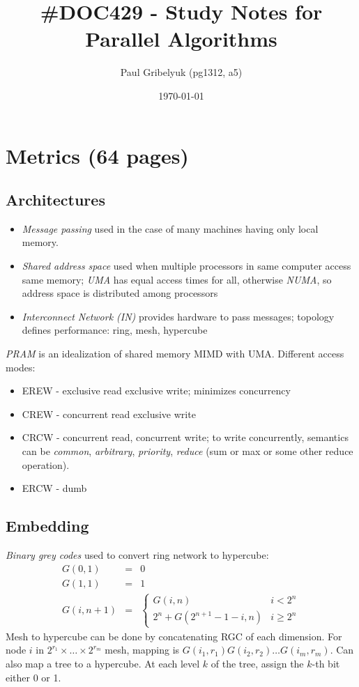 \documentclass[a4paper,10pt]{article}
\author{Paul Gribelyuk (pg1312, a5)}
\title{\Large \#DOC429 - Study Notes for Parallel Algorithms}
\date{\today}
\begin{document}
\maketitle

\section{Metrics (64 pages)}
\subsection{Architectures}
\begin{itemize}
\item \emph{Message passing} used in the case of many machines having only local memory.
\item \emph{Shared address space} used when multiple processors in same computer access same memory;  \emph{UMA} has equal access times for all, otherwise \emph{NUMA}, so address space is distributed among processors
\item \emph{Interconnect Network (IN)} provides hardware to pass messages; topology defines performance: ring, mesh, hypercube
\end{itemize}
\emph{PRAM} is an idealization of shared memory MIMD with UMA.  Different access modes:
\begin{itemize}
\item EREW - exclusive read exclusive write; minimizes concurrency
\item CREW - concurrent read exclusive write
\item CRCW - concurrent read, concurrent write; to write concurrently, semantics can be \emph{common}, \emph{arbitrary}, \emph{priority}, \emph{reduce} (sum or max or some other reduce operation).
\item ERCW - dumb
\end{itemize}
\subsection{Embedding}
\emph{Binary grey codes} used to convert ring network to hypercube:
\begin{eqnarray}
G(0,1) & = & 0 \\
G(1,1) & = & 1 \\
G(i, n+1) & = & \left\{ \begin{array}{ll}
G(i,n) & i < 2^n \\
2^n + G(2^{n+1} - 1 - i, n) & i \geq 2^n \end{array} \right.
\end{eqnarray}
Mesh to hypercube can be done by concatenating RGC of each dimension.  For node $i$ in $2^{r_1}\times\ldots \times2^{r_m}$ mesh, mapping is $G(i_1, r_1)G(i_2,r_2)\ldots G(i_m,r_m)$.  Can also map a tree to a hypercube.  At each level $k$ of the tree, assign the $k$-th bit either 0 or 1.
\end{document}
